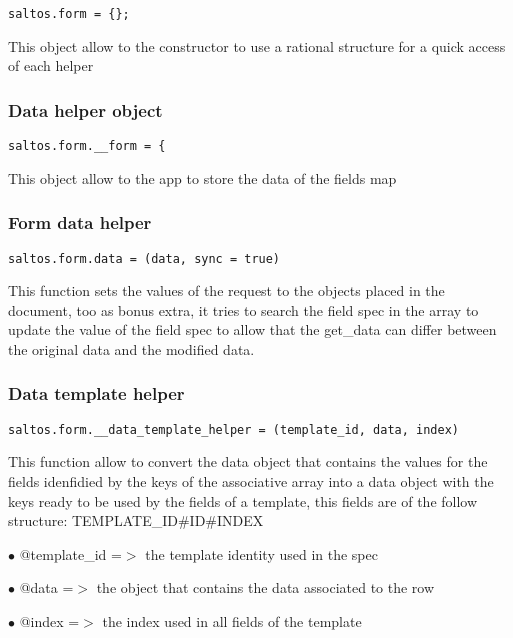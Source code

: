 \documentclass[a4paper]{article}
\begin{document}
\begin{lstlisting}
saltos.form = {};
\end{lstlisting}

This object allow to the constructor to use a rational structure for a quick access of each
helper

\hypertarget{toc775}{}
\subsubsection{Data helper object}

\begin{lstlisting}
saltos.form.__form = {
\end{lstlisting}

This object allow to the app to store the data of the fields map

\hypertarget{toc776}{}
\subsubsection{Form data helper}

\begin{lstlisting}
saltos.form.data = (data, sync = true)
\end{lstlisting}

This function sets the values of the request to the objects placed in the document, too as bonus
extra, it tries to search the field spec in the array to update the value of the field spec to
allow that the get\_data can differ between the original data and the modified data.

\hypertarget{toc777}{}
\subsubsection{Data template helper}

\begin{lstlisting}
saltos.form.__data_template_helper = (template_id, data, index)
\end{lstlisting}

This function allow to convert the data object that contains the values for the fields idenfidied
by the keys of the associative array into a data object with the keys ready to be used by the
fields of a template, this fields are of the follow structure: TEMPLATE\_ID\#ID\#INDEX

\begin{compactitem}
\item[\color{myblue}$\bullet$] @template\_id =$>$ the template identity used in the spec
\item[\color{myblue}$\bullet$] @data        =$>$ the object that contains the data associated to the row
\item[\color{myblue}$\bullet$] @index       =$>$ the index used in all fields of the template
\end{compactitem}
\end{document}
